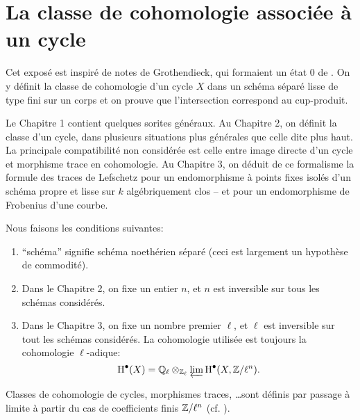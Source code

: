 
\chapter{La classe de cohomologie associée à un cycle}\label{IV}




Cet exposé est inspiré de notes de Grothendieck, qui formaient un état 0 
de \cite[IV]{sga5}. On y définit la classe de cohomologie d'un cycle $X$ dans 
un schéma séparé lisse de type fini sur un corps et on prouve que 
l'intersection correspond au cup-produit.

Le Chapitre 1 contient quelques sorites généraux. Au Chapitre 2, on 
définit la classe d'un cycle, dans plusieurs situations plus générales 
que celle dite plus haut. La principale compatibilité non considérée est 
celle entre image directe d'un cycle et morphisme trace en cohomologie. Au 
Chapitre 3, on déduit de ce formalisme la formule des traces de Lefschetz pour 
un endomorphisme à points fixes isolés d'un schéma propre et lisse sur $k$ 
algébriquement clos -- et pour un endomorphisme de Frobenius d'une courbe. 

Nous faisons les conditions suivantes:
\begin{enumerate}[\indent 1)]
  \item ``schéma'' signifie schéma noethérien séparé (ceci est 
    largement un hypothèse de commodité).
  \item Dans le Chapitre 2, on fixe un entier $n$, et $n$ est inversible sur 
    tous les schémas considérés.
  \item Dans le Chapitre 3, on fixe un nombre premier $\ell$, et $\ell$ est 
    inversible sur tout les schémas considérés. La cohomologie utilisée 
    est toujours la cohomologie $\ell$-adique:
    \[
      \operatorname{H}^\bullet(X) = \mathbb{Q}_\ell\otimes_{\mathbb{Z}_\ell} \varprojlim \operatorname{H}^\bullet(X,\mathbb{Z}/\ell^n) \text{.}
    \]
\end{enumerate}
Classes de cohomologie de cycles, morphismes traces, \ldots sont définis par 
passage à limite à partir du cas de coefficients finis $\mathbb{Z}/\ell^n$ (cf. 
\cite[VI]{sga5}).




















